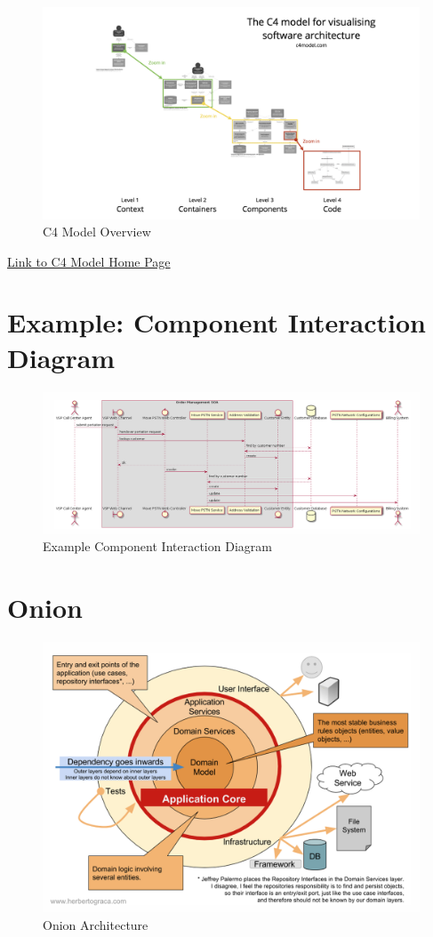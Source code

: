 \documentclass[../Main.tex]{subfiles}
\begin{document}
\begin{figure}[H]
    \centering
    \includegraphics[]{Images/c4-overview.png}
    \caption{C4 Model Overview}
    \label{fig:c4modeloverview}
\end{figure}
\href{https://c4model.com/}{Link to C4 Model Home Page}
\section{Example: Component Interaction Diagram}
\begin{figure}[H]
    \centering
    \includegraphics{Images/cid.png}
    \caption{Example Component Interaction Diagram}
    \label{fig:examplecid}
\end{figure}
\newpage
\section{Onion}
\begin{figure}[H]
    \centering
    \includegraphics{Images/onion.png}
    \caption{Onion Architecture}
    \label{fig:onionarch}
\end{figure}
\newpage
\end{document}
